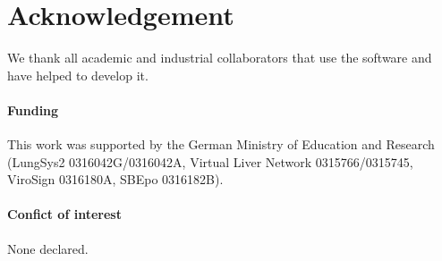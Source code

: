 \documentclass{bioinfo}
\begin{document}
\section*{Acknowledgement}
We thank all academic and industrial collaborators that use the software  
and have helped to develop it.

\paragraph{Funding\textcolon} 
This work was supported by the German Ministry of Education and Research (LungSys2 
0316042G/0316042A, Virtual Liver Network 0315766/0315745, ViroSign 0316180A,
SBEpo 0316182B).

\paragraph{Confict of interest\textcolon} None declared.



\end{document}
